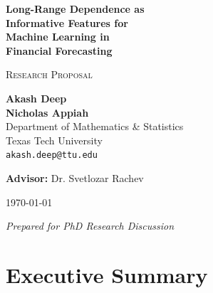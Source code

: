 \documentclass[11pt,a4paper]{article}
\theoremstyle{definition}
\begin{document}
\begin{titlepage}
    \centering
    \vspace*{2cm}
    
    {\Huge\bfseries\color{darkblue} Long-Range Dependence as\\[0.3cm] Informative Features for\\[0.3cm] Machine Learning in\\[0.3cm] Financial Forecasting\par}
    
    \vspace{1.5cm}
    
    {\Large\textsc{Research Proposal}\par}
    
    \vspace{2cm}
    
    {\large
    \textbf{Akash Deep}\\[0.3cm]
    \textbf{Nicholas Appiah}\\[0.3cm]
    Department of Mathematics \& Statistics\\[0.2cm]
    Texas Tech University\\[0.2cm]
    \texttt{akash.deep@ttu.edu}
    \par}
    
    \vspace{1.5cm}
    
    {\large
    \textbf{Advisor:} Dr. Svetlozar Rachev
    \par}
    
    \vspace{2cm}
    
    {\large \today \par}
    
    \vfill
    
    \textit{Prepared for PhD Research Discussion}
    
\end{titlepage}

\tableofcontents
\newpage

\section{Executive Summary}
\end{document}
